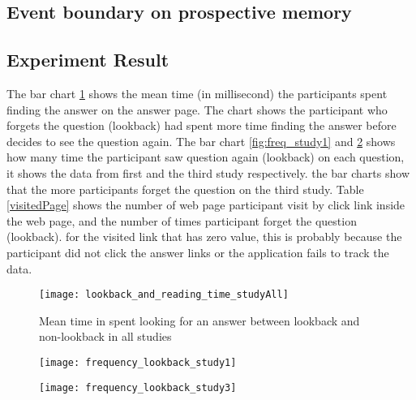 
\subsection{Event boundary on prospective memory}
\subsection{Experiment Result}
The bar chart \ref{fig:lookingAnswer_lookback} shows the mean time (in millisecond) the participants spent finding the answer on the answer page.
The chart shows the participant who forgets the question (lookback) had spent more time finding the answer before decides to see the question again.
The bar chart \ref{fig:freq_study1} and \ref{fig:freq_study3} shows how many time the participant saw question again (lookback) on each question, it shows the data from first and the third study respectively.
the bar charts show that the more participants forget the question on the third study.
Table \ref{visitedPage} shows the number of web page participant visit by click link inside the web page, and the number of times participant forget the question (lookback).
for the visited link that has zero value, this is probably because the participant did not click the answer links or the application fails to track the data.
\begin{figure}[!h]
\begin{center}
\texttt{[image: lookback\_and\_reading\_time\_studyAll]}
\end{center}
\captionsetup{justification=centering}
\caption{Mean time in spent looking for an answer between lookback and non-lookback in all studies}
\label{fig:lookingAnswer_lookback}
\end{figure}

\begin{figure}[!h]
\centering
\begin{minipage}{.5\textwidth}
  \centering
  \texttt{[image: frequency\_lookback\_study1]}
  \captionsetup{justification=centering}
  \label{fig:freq_study1}
\end{minipage}%
\begin{minipage}{.5\textwidth}
  \centering
  \texttt{[image: frequency\_lookback\_study3]}
  \captionsetup{justification=centering}
  \label{fig:freq_study3}
\end{minipage}
\end{figure}

